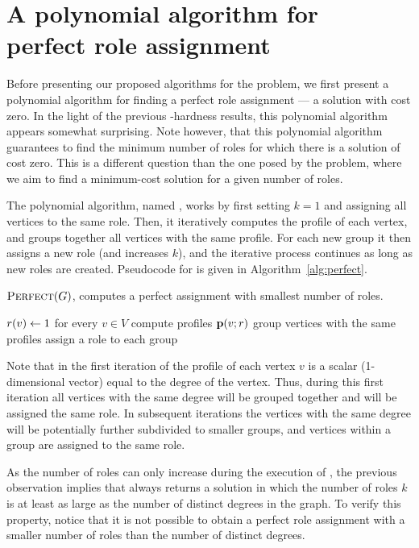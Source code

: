 \section{A polynomial algorithm for\\perfect role assignment}
\label{section:perfect}


Before presenting our proposed algorithms for the \prbrm problem, 
we first present a polynomial algorithm
for finding a perfect role assignment --- a solution with cost zero. 
In the light of the previous \np-hardness results, 
this polynomial algorithm appears somewhat surprising. 
Note however, that this polynomial algorithm 
guarantees to find the minimum number of roles for which there is a solution of cost zero. 
This is a different question than the one posed by the \prbrm problem, 
where we aim to find a minimum-cost solution for a given number of roles.

The polynomial algorithm, named \algperfect, 
works by first setting $k=1$ and assigning all vertices to the same role. 
Then, it iteratively computes the profile of each vertex, 
and groups together all vertices with the same profile. 
For each new group it then assigns a new role (and increases $k$), 
and the iterative process continues as long as new roles are created. 
Pseudocode for \algperfect is given in Algorithm~\ref{alg:perfect}.

\begin{algorithm}[t]
\caption{$\textsc{Perfect}(G)$, computes a perfect assignment with smallest number of roles.}
\label{alg:perfect}
	$r(v) \leftarrow 1$ for every $v \in V$\;
	 {
		compute profiles $\prof{v; \role}$\;
		group vertices with the same profiles\;
		assign a role to each group\;
	}
\end{algorithm}

Note that in the first iteration of \algperfect
the profile of each vertex $v$ is a scalar (1-dimensional vector) 
equal to the degree of the vertex.
Thus, during this first iteration
all vertices with the same degree will be grouped together and will be assigned the same role. 
In subsequent iterations the vertices with the same degree
will be potentially further subdivided to smaller groups, 
and vertices within a group are assigned to the same role. 

As the number of roles can only increase during the execution of \algperfect, 
the previous observation implies that \algperfect 
always returns a solution in which the number of roles $k$ is
at least as large as the number of distinct degrees in the graph. 
To verify this property, 
notice that it is not possible to obtain a perfect role assignment
with a smaller number of roles than the number of distinct degrees. 

